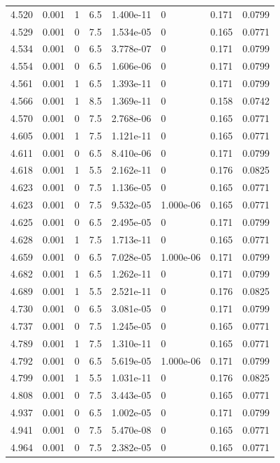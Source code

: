 \documentclass[preview]{standalone}
\begin{document}
{{{{{\begin{tabular}{L{1.2cm}C{1.2cm} C{0.3cm}C{0.5cm} C{1.4cm}C{1.4cm} C{1.4cm}C{1.4cm}}
  4.520  &  0.001  & 1     & 6.5 &  1.400e-11  & 0  & 0.171 &  0.0799   \\ 
  4.529  &  0.001  & 0     & 7.5 &  1.534e-05  & 0  & 0.165 &  0.0771   \\ 
  4.534  &  0.001  & 0     & 6.5 &  3.778e-07  & 0  & 0.171 &  0.0799   \\ 
  4.554  &  0.001  & 0     & 6.5 &  1.606e-06  & 0  & 0.171 &  0.0799   \\ 
  4.561  &  0.001  & 1     & 6.5 &  1.393e-11  & 0  & 0.171 &  0.0799   \\ 
  4.566  &  0.001  & 1     & 8.5 &  1.369e-11  & 0  & 0.158 &  0.0742   \\ 
  4.570  &  0.001  & 0     & 7.5 &  2.768e-06  & 0  & 0.165 &  0.0771   \\ 
  4.605  &  0.001  & 1     & 7.5 &  1.121e-11  & 0  & 0.165 &  0.0771   \\ 
  4.611  &  0.001  & 0     & 6.5 &  8.410e-06  & 0  & 0.171 &  0.0799   \\ 
  4.618  &  0.001  & 1     & 5.5 &  2.162e-11  & 0  & 0.176 &  0.0825   \\ 
  4.623  &  0.001  & 0     & 7.5 &  1.136e-05  & 0  & 0.165 &  0.0771   \\ 
  4.623  &  0.001  & 0     & 7.5 &  9.532e-05  & 1.000e-06  & 0.165 &  0.0771   \\ 
  4.625  &  0.001  & 0     & 6.5 &  2.495e-05  & 0  & 0.171 &  0.0799   \\ 
  4.628  &  0.001  & 1     & 7.5 &  1.713e-11  & 0  & 0.165 &  0.0771   \\ 
  4.659  &  0.001  & 0     & 6.5 &  7.028e-05  & 1.000e-06  & 0.171 &  0.0799   \\ 
  4.682  &  0.001  & 1     & 6.5 &  1.262e-11  & 0  & 0.171 &  0.0799   \\ 
  4.689  &  0.001  & 1     & 5.5 &  2.521e-11  & 0  & 0.176 &  0.0825   \\ 
  4.730  &  0.001  & 0     & 6.5 &  3.081e-05  & 0  & 0.171 &  0.0799   \\ 
  4.737  &  0.001  & 0     & 7.5 &  1.245e-05  & 0  & 0.165 &  0.0771   \\ 
  4.789  &  0.001  & 1     & 7.5 &  1.310e-11  & 0  & 0.165 &  0.0771   \\ 
  4.792  &  0.001  & 0     & 6.5 &  5.619e-05  & 1.000e-06  & 0.171 &  0.0799   \\ 
  4.799  &  0.001  & 1     & 5.5 &  1.031e-11  & 0  & 0.176 &  0.0825   \\ 
  4.808  &  0.001  & 0     & 7.5 &  3.443e-05  & 0  & 0.165 &  0.0771   \\ 
  4.937  &  0.001  & 0     & 6.5 &  1.002e-05  & 0  & 0.171 &  0.0799   \\ 
  4.941  &  0.001  & 0     & 7.5 &  5.470e-08  & 0  & 0.165 &  0.0771   \\ 
  4.964  &  0.001  & 0     & 7.5 &  2.382e-05  & 0  & 0.165 &  0.0771   \\ 
\hline 
\end{tabular} 

}}}}}
\end{document}
